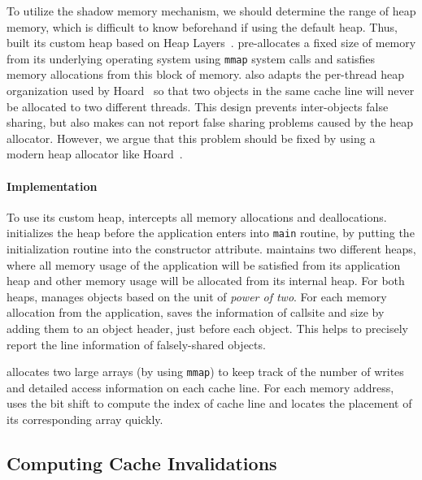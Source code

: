 To utilize the shadow memory mechanism, we should determine the range of heap memory, which is difficult to know beforehand if using the default heap. Thus, \cheetah{} built its custom heap based on Heap Layers~\cite{Berger:2001:CHM:378795.378821}. \cheetah{} pre-allocates a fixed size of memory
from its underlying operating system using \texttt{mmap} system calls and satisfies memory allocations from this block of memory. \cheetah{} also adapts the per-thread heap organization used by Hoard~\cite{Hoard} so that two objects in the same cache line will never be allocated to two different threads. This design prevents inter-objects false sharing, but also makes \cheetah{} can not report false sharing problems caused by the heap allocator.  However, we argue that this problem should be fixed by using a modern heap allocator like Hoard~\cite{Hoard}. 

\paragraph{Implementation} 
To use its custom heap, \cheetah{} intercepts all memory allocations and deallocations. \cheetah{} initializes the heap before the application enters into \texttt{main} routine, by putting the initialization routine into the constructor attribute. \cheetah{} maintains two different heaps, where all memory usage of the application will be satisfied from its application heap and other memory usage will be allocated from its internal heap. For both heaps, \cheetah{} manages objects based on the unit of {\it power of two}. For each memory allocation from the application, \cheetah{} saves the information of callsite and size by adding them to an object header, just before each object. This helps \cheetah{} to precisely report the line information of falsely-shared objects.  

\Cheetah{} allocates two large arrays (by using \texttt{mmap}) to keep track of the number of writes and detailed access information on each cache line. For each memory address, \cheetah{} uses the bit shift to compute the index of cache line and locates the placement of its corresponding array quickly. 


\subsection{Computing Cache Invalidations}
\label{sec:computeinvalidations}

